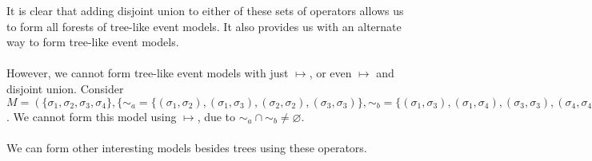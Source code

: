 \documentclass[12pt, a4paper, titlepage]{scrartcl}
\begin{document}
It is clear that adding disjoint union to either of these sets of operators
allows us to form all forests of tree-like event models.
It also provides us with an alternate way to form tree-like event models.\\
\\
However, we cannot form tree-like event models with just $\mapsto$, or even
$\mapsto$ and disjoint union.
Consider $M = ( \{\sigma_1, \sigma_2, \sigma_3, \sigma_4\}, \{\sim_a =
\{(\sigma_1,\sigma_2),(\sigma_1,\sigma_3),(\sigma_2,\sigma_2),(\sigma_3,\sigma_3)\},
\sim_b =
\{(\sigma_1,\sigma_3),(\sigma_1,\sigma_4),(\sigma_3,\sigma_3),(\sigma_4,\sigma_4)\}\},
pre)$.
We cannot form this model using $ \mapsto $, due to $\sim_a \cap \sim_b \neq
\varnothing$.\\
\\
We can form other interesting models besides trees using these operators.
\end{document}
